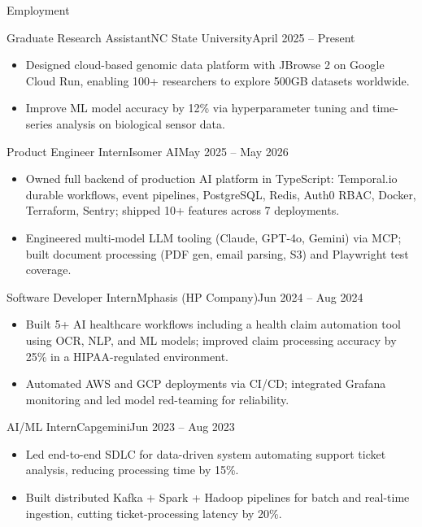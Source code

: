 \documentclass[]{mcdowellcv}
\begin{document}
\makeheader

\begin{cvsection}{Employment}
  \begin{cvsubsection}{Graduate Research Assistant}{NC State University}{April 2025 -- Present}
    \begin{itemize}
      \item Designed cloud-based genomic data platform with JBrowse 2 on Google Cloud Run, enabling 100+ researchers to explore 500GB datasets worldwide.
      \item Improve ML model accuracy by 12\% via hyperparameter tuning and time-series analysis on biological sensor data.
    \end{itemize}
    \vspace{-1.5pt}
  \end{cvsubsection}

  \begin{cvsubsection}{Product Engineer Intern}{Isomer AI}{May 2025 -- May 2026}
    \begin{itemize}
      \item Owned full backend of production AI platform in TypeScript: Temporal.io durable workflows, event pipelines, PostgreSQL, Redis, Auth0 RBAC, Docker, Terraform, Sentry; shipped 10+ features across 7 deployments.
      \item Engineered multi-model LLM tooling (Claude, GPT-4o, Gemini) via MCP; built document processing (PDF gen, email parsing, S3) and Playwright test coverage.
    \end{itemize}
    \vspace{-1.5pt}
  \end{cvsubsection}

  \begin{cvsubsection}{Software Developer Intern}{Mphasis (HP Company)}{Jun 2024 -- Aug 2024}
    \begin{itemize}
      \item Built 5+ AI healthcare workflows including a health claim automation tool using OCR, NLP, and ML models; improved claim processing accuracy by 25\% in a HIPAA-regulated environment.
      \item Automated AWS and GCP deployments via CI/CD; integrated Grafana monitoring and led model red-teaming for reliability.
    \end{itemize}
    \vspace{-1.5pt}
  \end{cvsubsection}

  \begin{cvsubsection}{AI/ML Intern}{Capgemini}{Jun 2023 -- Aug 2023}
    \begin{itemize}
      \item Led end-to-end SDLC for data-driven system automating support ticket analysis, reducing processing time by 15\%.
      \item Built distributed Kafka + Spark + Hadoop pipelines for batch and real-time ingestion, cutting ticket-processing latency by 20\%.
    \end{itemize}
    \vspace{-1.5pt}
  \end{cvsubsection}
\end{cvsection}
\end{document}

